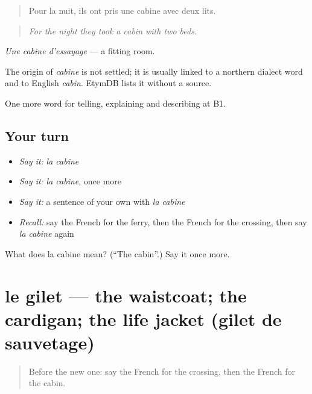 \begin{quote}
Pour la nuit, ils ont pris une cabine avec deux lits.
\end{quote}

\begin{quote}
\emph{For the night they took a cabin with two beds.}
\end{quote}

\emph{Une cabine d'essayage} — a fitting room.

\begin{cousinweb}
The origin of \emph{cabine} is not settled; it is usually linked to a northern dialect word and to English \emph{cabin}. EtymDB lists it without a source.
\end{cousinweb}

\begin{grammarlens}[title={What you've built}]
One more word for telling, explaining and describing at B1.
\end{grammarlens}

\subsection*{Your turn}
\begin{itemize}
\raggedright
  \item \emph{Say it:} \emph{la cabine}
  \item \emph{Say it:} \emph{la cabine}, once more
  \item \emph{Say it:} a sentence of your own with \emph{la cabine}
  \item \emph{Recall:} say the French for the ferry, then the French for the crossing, then say \emph{la cabine} again
\end{itemize}

\begin{tcolorbox}[breakable,colback=teal!4,colframe=teal!35!black,title={Before you move on}]
What does la cabine mean? (\textquotedblleft{}The cabin\textquotedblright{}.) Say it once more.
\end{tcolorbox}
\section[le gilet]{le gilet — the waistcoat; the cardigan; the life jacket (gilet de sauvetage)}

\label{lesson:FR-C422-gilet}



\begin{quote}
Before the new one: say the French for the crossing, then the French for the cabin.
\end{quote}

